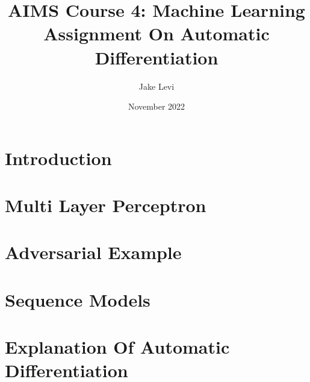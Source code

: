 \documentclass{article}
\title{
    AIMS Course 4: Machine Learning \\
    \large Assignment On Automatic Differentiation
}
\author{Jake Levi}
\date{November 2022}
\begin{document}
\maketitle
\section{Introduction} \label{section:intro}

\section{Multi Layer Perceptron}

\section{Adversarial Example}

\section{Sequence Models}



\appendix
\section{Explanation Of Automatic Differentiation}\label{appendix:autodiff}
\end{document}
